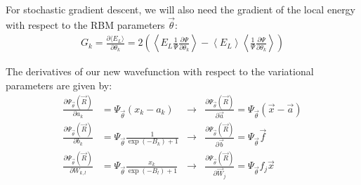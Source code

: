 \documentclass[12pt]{article}
\begin{document}
\noindent For stochastic gradient descent, we will also need the gradient of the local energy with respect to the RBM parameters $\vec{\theta}$:
\begin{align*}
G_k = \frac{\partial \langle E_L \rangle}{\partial \theta_k} = 2 \left( \left\langle E_L \frac{1}{\Psi} \frac{\partial \Psi}{\partial \theta_k} \right\rangle - \left\langle E_L \right\rangle \left\langle \frac{1}{\Psi} \frac{\partial \Psi}{\partial \theta_k} \right\rangle \right)
\end{align*}

\noindent The derivatives of our new wavefunction with respect to the variational parameters are given by:
\begin{align*}
\frac{\partial \Psi_{\vec{\theta}}(\vec{R})}{\partial a_k} &= \Psi_{\vec{\theta}} (x_k - a_k) 
&\longrightarrow &\frac{\partial \Psi_{\vec{\theta}}(\vec{R})}{\partial \vec{a}} = \Psi_{\vec{\theta}} (\vec{x}-\vec{a}) \\
\frac{\partial \Psi_{\vec{\theta}}(\vec{R})}{\partial b_k} &= \Psi_{\vec{\theta}} \frac{1}{\exp(-B_k)+1}
&\longrightarrow &\frac{\partial \Psi_{\vec{\theta}}(\vec{R})}{\partial \vec{b}} = \Psi_{\vec{\theta}} \vec{f} \\
\frac{\partial \Psi_{\vec{\theta}}(\vec{R})}{\partial W_{k,l}} &= \Psi_{\vec{\theta}} \frac{x_k}{\exp(-B_l)+1}
&\longrightarrow &\frac{\partial \Psi_{\vec{\theta}}(\vec{R})}{\partial \vec{W}_j} = \Psi_{\vec{\theta}} f_j\vec{x} \\
\end{align*}
\end{document}
